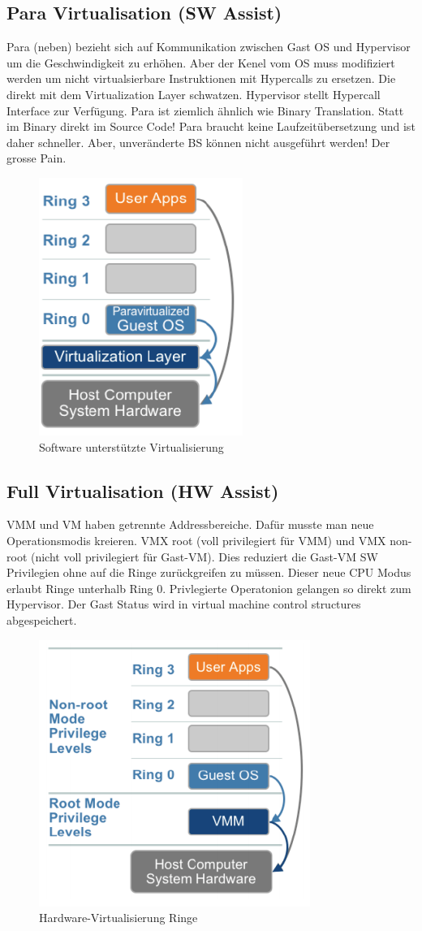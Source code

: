 \subsection{Para Virtualisation (SW Assist)}
Para (neben) bezieht sich auf Kommunikation zwischen Gast OS und Hypervisor um die Geschwindigkeit zu erhöhen. Aber der Kenel vom OS muss modifiziert werden um nicht virtualsierbare Instruktionen mit Hypercalls zu ersetzen. Die direkt mit dem Virtualization Layer schwatzen. Hypervisor stellt Hypercall Interface zur Verfügung.
Para ist ziemlich ähnlich wie Binary Translation. Statt im Binary direkt im Source Code! Para braucht keine Laufzeitübersetzung und ist daher schneller. Aber, unveränderte BS können nicht ausgeführt werden! Der grosse Pain.
\begin{figure}[h!]
\centering
\includegraphics[width=0.4\linewidth]{fig/sw-virtualisierung-ringe}
\caption{Software unterstützte Virtualisierung}
\label{fig:sw-virtualisierung-ringe}
\end{figure}



\subsection{Full Virtualisation (HW Assist)}
\label{sec:hw-unterstuetzt-virt}
VMM und VM haben getrennte Addressbereiche. Dafür musste man neue Operationsmodis kreieren. VMX root (voll privilegiert für VMM) und VMX non-root (nicht voll privilegiert für Gast-VM). Dies reduziert die Gast-VM SW Privilegien ohne auf die Ringe zurückgreifen zu müssen. Dieser neue CPU Modus erlaubt Ringe unterhalb Ring 0. Privlegierte Operatonion gelangen so direkt zum Hypervisor. Der Gast Status wird in virtual machine control structures abgespeichert.
\begin{figure}[h!]
\centering
\includegraphics[width=0.4\linewidth]{fig/hw-virtualisierung-ringe}
\caption{Hardware-Virtualisierung Ringe}
\label{fig:hw-virtualisierung-ringe}
\end{figure}


